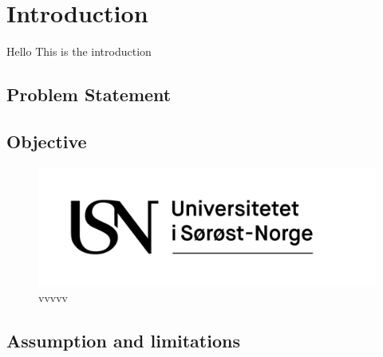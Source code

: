 \chapter{Introduction}
Hello This is the introduction


\section{Problem Statement}
\section{Objective}

\begin{figure}[H]
  \centering
  \includegraphics[width=0.99\linewidth]{figures/logos/USN_logo_rgb.png}
  \caption{vvvvv}
\end{figure}%
\section{Assumption and limitations}
